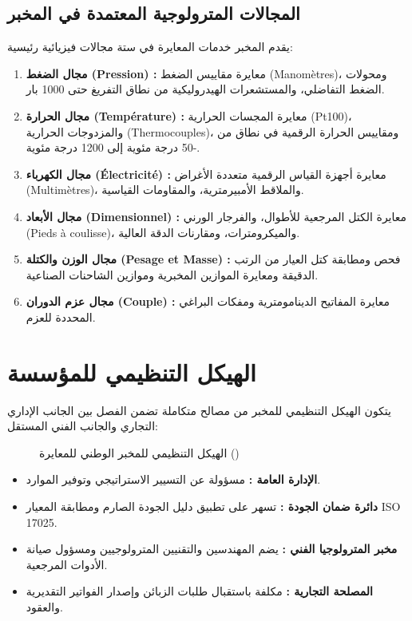 \documentclass{bts-report-ar}
\begin{document}
\subsection{المجالات المترولوجية المعتمدة في المخبر}
يقدم المخبر خدمات المعايرة في ستة مجالات فيزيائية رئيسية:
\begin{enumerate}
  \item \textbf{مجال الضغط (Pression) :} معايرة مقاييس الضغط (Manomètres)، ومحولات الضغط التفاضلي، والمستشعرات الهيدروليكية من نطاق التفريغ حتى 1000 بار.
  \item \textbf{مجال الحرارة (Température) :} معايرة المجسات الحرارية (Pt100)، والمزدوجات الحرارية (Thermocouples)، ومقاييس الحرارة الرقمية في نطاق من -50 درجة مئوية إلى 1200 درجة مئوية.
  \item \textbf{مجال الكهرباء (Électricité) :} معايرة أجهزة القياس الرقمية متعددة الأغراض (Multimètres)، والملاقط الأمبيرمترية، والمقاومات القياسية.
  \item \textbf{مجال الأبعاد (Dimensionnel) :} معايرة الكتل المرجعية للأطوال، والفرجار الورني (Pieds à coulisse)، والميكرومترات، ومقارنات الدقة العالية.
  \item \textbf{مجال الوزن والكتلة (Pesage et Masse) :} فحص ومطابقة كتل العيار من الرتب الدقيقة ومعايرة الموازين المخبرية وموازين الشاحنات الصناعية.
  \item \textbf{مجال عزم الدوران (Couple) :} معايرة المفاتيح الدينامومترية ومفكات البراغي المحددة للعزم.
\end{enumerate}

\section{الهيكل التنظيمي للمؤسسة}
يتكون الهيكل التنظيمي للمخبر من مصالح متكاملة تضمن الفصل بين الجانب الإداري التجاري والجانب الفني المستقل:

\begin{figure}[H]
  \centering
  \begin{LTR}
  
  \end{LTR}
  \caption{الهيكل التنظيمي للمخبر الوطني للمعايرة ()}
  \label{fig:org-chart}
\end{figure}

\begin{itemize}
  \item \textbf{الإدارة العامة :} مسؤولة عن التسيير الاستراتيجي وتوفير الموارد.
  \item \textbf{دائرة ضمان الجودة :} تسهر على تطبيق دليل الجودة الصارم ومطابقة المعيار ISO 17025.
  \item \textbf{مخبر المترولوجيا الفني :} يضم المهندسين والتقنيين المترولوجيين ومسؤول صيانة الأدوات المرجعية.
  \item \textbf{المصلحة التجارية :} مكلفة باستقبال طلبات الزبائن وإصدار الفواتير التقديرية والعقود.
\end{itemize}
\end{document}
